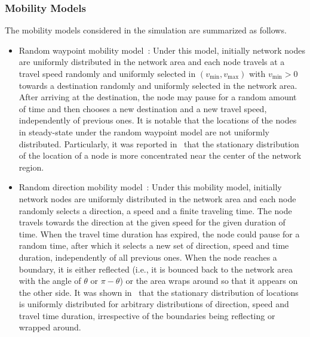 \documentclass[twocolumn, 10pt]{svjour3}         \smartqed  \usepackage{graphicx}
\begin{document}
\subsubsection{Mobility Models}\label{sec:numerical:mobility}
The mobility models considered in the simulation are summarized as follows.
\begin{itemize}


\item  Random waypoint mobility model~\cite{Groenevelt2005}:
Under this model, initially network nodes are uniformly distributed in the network area and each node travels at a  travel speed randomly and uniformly selected in $(v_\text{min}, v_\text{max})$ with $v_\text{min} > 0$ towards a destination randomly and uniformly selected in the network area. 
After arriving at the destination, the node may pause for a random amount of time and then chooses a new destination and a new travel speed, independently of previous ones.
It is notable that the  locations of the nodes in steady-state under the random waypoint model are not uniformly distributed.
Particularly, it was reported in~\cite{Bettstetter2002Proc.WMAN} that the stationary distribution of the location of a node  is more concentrated near the center of the network region.

\item  Random direction mobility model~\cite{Groenevelt2005}: Under this mobility model, initially network nodes are uniformly distributed in the network area and each node randomly selects a direction, a speed and a finite traveling time.
The node travels towards the direction at the given speed for the given duration of time. 
When the travel time duration has expired,  the node could pause for a random time, after which it selects a new set of direction, speed and time duration, independently of all previous ones.
When the node reaches a boundary, it is either reflected (i.e., it is bounced back to the network
area with the angle of $\theta$ or $\pi - \theta$) or the area wraps around so that it appears on the other side.
It was shown in~\cite{Nain2005Proc.IEEEINFOCOM} that the stationary distribution of locations is uniformly distributed for arbitrary distributions of direction, speed and travel time duration, irrespective of the boundaries being reflecting or wrapped around.

\end{itemize}
\end{document}
